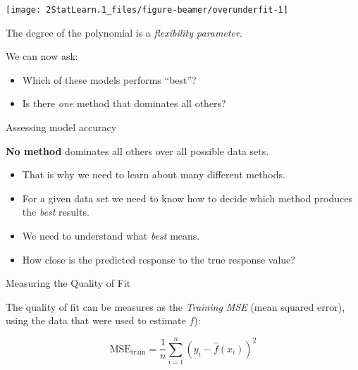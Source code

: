 \documentclass[ignorenonframetext,]{beamer}
\providecommand{\tightlist}{%
  \setlength{\itemsep}{0pt}\setlength{\parskip}{0pt}}
\begin{document}
\begin{frame}

\begin{center}\texttt{[image: 2StatLearn.1\_files/figure-beamer/overunderfit-1]} \end{center}

The degree of the polynomial is a \emph{flexibility parameter}.

\end{frame}

\begin{frame}

We can now ask:

\begin{itemize}
\item
  Which of these models performs ``best''?
\item
  Is there \emph{one} method that dominates all others?
\end{itemize}

\end{frame}

\begin{frame}{Assessing model accuracy}
\protect\hypertarget{assessing-model-accuracy}{}

\textbf{No method} dominates all others over all possible data sets.

\begin{itemize}
\tightlist
\item
  That is why we need to learn about many different methods.
\item
  For a given data set we need to know how to decide which method
  produces the \emph{best} results.
\item
  We need to understand what \emph{best} means.
\item
  How close is the predicted response to the true response value?
\end{itemize}

\end{frame}

\begin{frame}

\begin{block}{Measuring the Quality of Fit}

\vspace{2mm}

The quality of fit can be measures as the \emph{Training MSE} (mean
squared error), using the data that were used to estimate \(f\)):

\[ \text{MSE}_{\text{train}}=\frac{1}{n}\sum_{i=1}^n (y_i-\hat{f}(x_i))^2\]
\(~\)

\end{block}

\end{frame}
\end{document}
